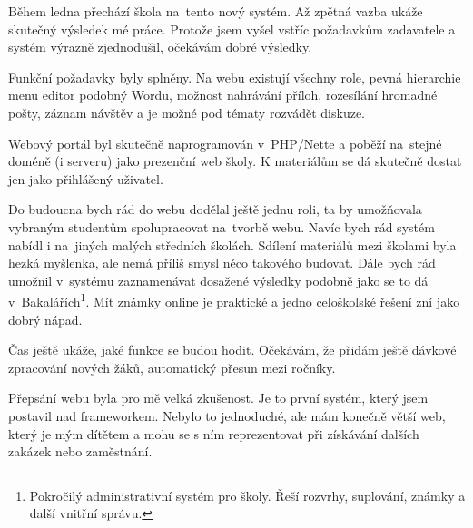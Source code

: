 \documentclass[thesis=B,czech]{FITthesis}[2012/06/26]
\begin{document}
\begin{conclusion}
Během ledna přechází škola na~tento nový systém. Až zpětná vazba ukáže skutečný výsledek mé práce. Protože jsem vyšel vstříc požadavkům zadavatele a systém výrazně zjednodušil, očekávám dobré výsledky.
	
Funkční požadavky byly splněny. Na webu existují všechny role, pevná hierarchie menu editor podobný Wordu, možnost nahrávání příloh, rozesílání hromadné pošty, záznam návštěv a je možné pod tématy rozvádět diskuze.

Webový portál byl skutečně naprogramován v~PHP/Nette a poběží na~stejné doméně (i serveru) jako prezenční web školy. K materiálům se dá skutečně dostat jen jako přihlášený uživatel.

Do budoucna bych rád do webu dodělal ještě jednu roli, ta by umožňovala vybraným studentům spolupracovat na~tvorbě webu. Navíc bych rád systém nabídl i na~jiných malých středních školách. Sdílení materiálů mezi školami byla hezká myšlenka, ale nemá příliš smysl něco takového budovat. Dále bych rád umožnil v~systému zaznamenávat dosažené výsledky podobně jako se to dá v~Bakalářích\footnote{Pokročilý administrativní systém pro školy. Řeší rozvrhy, suplování, známky a další vnitřní správu.}. Mít známky online je praktické a jedno celoškolské řešení zní jako dobrý nápad.

Čas ještě ukáže, jaké funkce se budou hodit. Očekávám, že přidám ještě dávkové zpracování nových žáků, automatický přesun mezi ročníky.

Přepsání webu byla pro mě velká zkušenost. Je to první systém, který jsem postavil nad  frameworkem. Nebylo to jednoduché, ale mám konečně větší web, který je mým dítětem a mohu se s ním reprezentovat při získávání dalších zakázek nebo zaměstnání. 

\end{conclusion}
\end{document}
